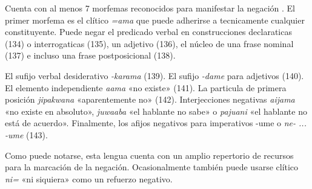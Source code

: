 Cuenta con al menos 7 morfemas reconocidos para manifestar la negación \textcolor{MidnightBlue}{\citep{cavin}}. El primer morfema es el clítico {\setmainfont{Charis SIL} \textit{=ama}} que puede adherirse a tecnicamente cualquier constituyente. Puede negar el predicado verbal en construcciones declaraticas (134) o interrogaticas (135), un adjetivo (136), el núcleo de una frase nominal (137) e incluso una frase postposicional (138).

El sufijo verbal desiderativo {\setmainfont{Charis SIL} \textit{-karama}} (139). El sufijo {\setmainfont{Charis SIL} \textit{-dame}} para adjetivos (140). El elemento independiente {\setmainfont{Charis SIL} \textit{aama}} «no existe» (141). La particula de primera posición {\setmainfont{Charis SIL} \textit{jipakwana}} «aparentemente no» (142). Interjecciones negativas {\setmainfont{Charis SIL} \textit{aijama}} «no existe en absoluto», {\setmainfont{Charis SIL} \textit{juwaaba}} «el hablante no sabe» o {\setmainfont{Charis SIL} \textit{pajuani}} «el hablante no está de acuerdo». Finalmente, los afijos negativos para imperativos {\setmainfont{Charis SIL} -ume} o {\setmainfont{Charis SIL} \textit{ne- ... -ume}} (143).

Como puede notarse, esta lengua cuenta con un amplio repertorio de recursos para la marcación de la negación. Ocasionalmente también puede usarse clítico{\setmainfont{Charis SIL} \textit{ni=}} «ni siquiera» como un refuerzo negativo.